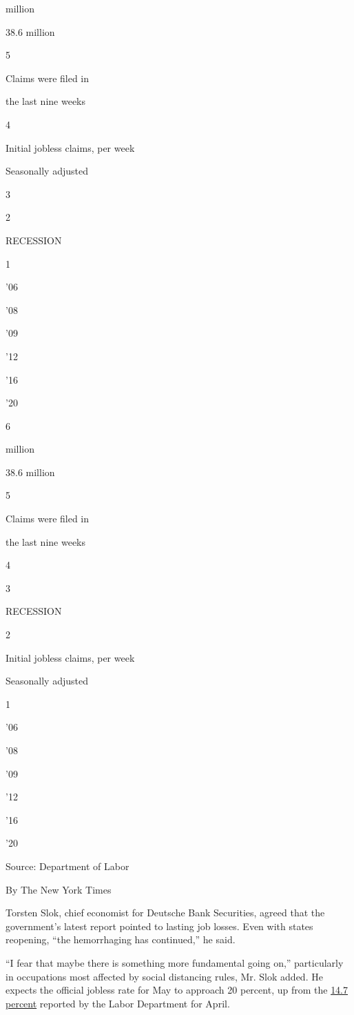 million

38.6 million

5

Claims were filed in

the last nine weeks

4

Initial jobless claims, per week

Seasonally adjusted

3

2

RECESSION

1

'06

'08

'09

'12

'16

'20

6

million

38.6 million

5

Claims were filed in

the last nine weeks

4

3

RECESSION

2

Initial jobless claims, per week

Seasonally adjusted

1

'06

'08

'09

'12

'16

'20

Source: Department of Labor

By The New York Times

Torsten Slok, chief economist for Deutsche Bank Securities, agreed that
the government's latest report pointed to lasting job losses. Even with
states reopening, ``the hemorrhaging has continued,'' he said.

``I fear that maybe there is something more fundamental going on,''
particularly in occupations most affected by social distancing rules,
Mr. Slok added. He expects the official jobless rate for May to approach
20 percent, up from the
\href{https://www.nytimes3xbfgragh.onion/interactive/2020/05/08/business/economy/april-jobs-report.html}{14.7
percent} reported by the Labor Department for April.

